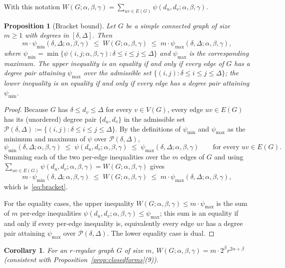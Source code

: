\documentclass[a5paper, 10pt]{article}
\theoremstyle{plain}
\newtheorem{proposition}[theorem]{Proposition}
\newtheorem*{corollary}{Corollary}
\theoremstyle{remark}
\theoremstyle{definition}
\newcommand{\Wuzi}{W(G;\alpha,\beta,\gamma)}
\begin{document}
With this notation $\Wuzi = \sum_{uv \in E(G)} \psi(d_u, d_v; \alpha, \beta, \gamma)$.

\begin{proposition}[Bracket bound]\label{thm:bracket}
Let $G$ be a simple connected graph of size $m \ge 1$ with
degrees in $[\delta, \Delta]$. Then
\begin{equation}\label{eq:bracket}
m \cdot \psi_{\min}(\delta, \Delta; \alpha, \beta, \gamma)
\;\le\; \Wuzi \;\le\;
m \cdot \psi_{\max}(\delta, \Delta; \alpha, \beta, \gamma),
\end{equation}
where
$\psi_{\min} = \min\{\psi(i, j; \alpha, \beta, \gamma)
              : \delta \le i \le j \le \Delta\}$
and $\psi_{\max}$ is the corresponding maximum. The upper
inequality is an equality if and only if every edge of $G$ has a
degree pair attaining $\psi_{\max}$ over the admissible set
$\{(i, j) : \delta \le i \le j \le \Delta\}$; the lower
inequality is an equality if and only if every edge has a degree
pair attaining $\psi_{\min}$.
\end{proposition}

\begin{proof}
Because $G$ has $\delta \le d_v \le \Delta$ for every
$v \in V(G)$, every edge $uv \in E(G)$ has its (unordered) degree
pair $\{d_u, d_v\}$ in the admissible set
$\mathcal{P}(\delta, \Delta) := \{(i, j) : \delta \le i \le j \le \Delta\}$.
By the definitions of $\psi_{\min}$ and $\psi_{\max}$ as the
minimum and maximum of $\psi$ over $\mathcal{P}(\delta, \Delta)$,
\[
\psi_{\min}(\delta, \Delta; \alpha, \beta, \gamma)
\;\le\;
\psi(d_u, d_v; \alpha, \beta, \gamma)
\;\le\;
\psi_{\max}(\delta, \Delta; \alpha, \beta, \gamma)
\qquad
\text{for every } uv \in E(G).
\]
Summing each of the two per-edge inequalities over the $m$ edges
of $G$ and using $\sum_{uv \in E(G)} \psi(d_u, d_v; \alpha, \beta, \gamma) = \Wuzi$
gives
\[
m \cdot \psi_{\min}(\delta, \Delta; \alpha, \beta, \gamma)
\;\le\;
\Wuzi
\;\le\;
m \cdot \psi_{\max}(\delta, \Delta; \alpha, \beta, \gamma),
\]
which is~\eqref{eq:bracket}.

For the equality cases, the upper inequality
$\Wuzi \le m \cdot \psi_{\max}$ is the sum of $m$ per-edge
inequalities $\psi(d_u, d_v; \alpha, \beta, \gamma) \le \psi_{\max}$;
this sum is an equality if and only if every per-edge inequality
is, equivalently every edge $uv$ has a degree pair attaining
$\psi_{\max}$ over $\mathcal{P}(\delta, \Delta)$. The lower
equality case is dual.
\end{proof}

\begin{corollary}\label{cor:regular_value}
For an $r$-regular graph $G$ of size $m$,
$\Wuzi = m \cdot 2^{\beta} r^{2\alpha + \beta}$
(consistent with Proposition~\ref{prop:closedforms}(9)).
\end{corollary}
\end{document}

